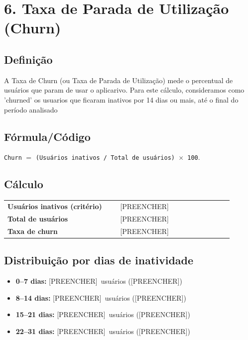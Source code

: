 \documentclass[12pt]{article}
\providecommand{\ChurnInativos}{[PREENCHER]}
\providecommand{\ChurnTotalUsuarios}{[PREENCHER]}
\providecommand{\ChurnTaxa}{[PREENCHER]}
\providecommand{\InatA}{[PREENCHER]}\providecommand{\InatAperc}{[PREENCHER]}
\providecommand{\InatB}{[PREENCHER]}\providecommand{\InatBperc}{[PREENCHER]}
\providecommand{\InatC}{[PREENCHER]}\providecommand{\InatCperc}{[PREENCHER]}
\providecommand{\InatD}{[PREENCHER]}\providecommand{\InatDperc}{[PREENCHER]}
\begin{document}
\section*{6. Taxa de Parada de Utilização (Churn)}
\subsection*{Definição}
A Taxa de Churn (ou Taxa de Parada de Utilização) mede o percentual de usuários que param de usar o aplicarivo. Para este cálculo, consideramos como 'churned' os usuarios que ficaram inativos por 14 dias ou mais, até o final do período analisado

\subsection*{Fórmula/Código}
\noindent \texttt{Churn} $=$ \texttt{(Usuários inativos / Total de usuários) $\times$ 100}.

\subsection*{Cálculo}
\begin{center}
\begin{tabular}{>{\bfseries}p{0.45\linewidth} p{0.45\linewidth}}
\toprule
Usuários inativos (critério) & \ChurnInativos \\
Total de usuários & \ChurnTotalUsuarios \\
Taxa de churn & \ChurnTaxa \\
\bottomrule
\end{tabular}
\end{center}

\subsection*{Distribuição por dias de inatividade}
\begin{itemize}
  \item \textbf{0--7 dias:} \InatA\ usuários (\InatAperc)
  \item \textbf{8--14 dias:} \InatB\ usuários (\InatBperc)
  \item \textbf{15--21 dias:} \InatC\ usuários (\InatCperc)
  \item \textbf{22--31 dias:} \InatD\ usuários (\InatDperc)
\end{itemize}

\end{document}
